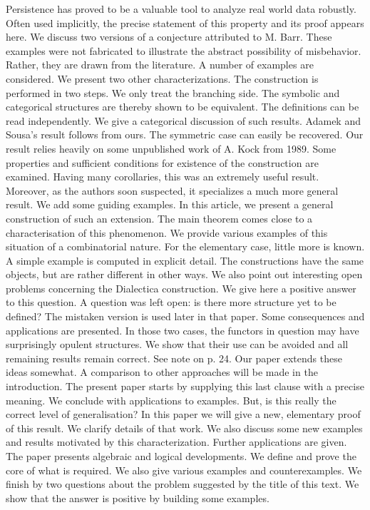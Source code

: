 Persistence has proved to be a valuable tool to analyze real world data robustly.
Often used implicitly, the precise statement of this property and its proof appears here.
We discuss two versions of a conjecture attributed to M. Barr.
These examples were not fabricated to illustrate the abstract possibility of misbehavior.
Rather, they are drawn from the literature.
A number of examples are considered.
We present two other characterizations.
The construction is performed in two steps.
We only treat the branching side.
The symbolic and categorical structures are thereby shown to be equivalent.
The definitions can be read independently.
We give a categorical discussion of such results.
Adamek and Sousa's result follows from ours.
The symmetric case can easily be recovered.
Our result relies heavily on some unpublished work of A. Kock from 1989.
Some properties and sufficient conditions for existence of the construction are examined.
Having many corollaries, this was an extremely useful result.
Moreover, as the authors soon suspected, it specializes a much more general result.
We add some guiding examples.
In this article, we present a general construction of such an extension.
The main theorem comes close to a characterisation of this phenomenon.
We provide various examples of this situation of a combinatorial nature.
For the elementary case, little more is known.
A simple example is computed in explicit detail.
The constructions have the same objects, but are rather different in other ways.
We also point out interesting open problems concerning the Dialectica construction.
We give here a positive answer to this question.
A question was left open: is there more structure yet to be defined?
The mistaken version is used later in that paper.
Some consequences and applications are presented.
In those two cases, the functors in question may have surprisingly opulent structures. 	 		
We show that their use can be avoided and all remaining results remain correct.
See note on p. 24.
Our paper extends these ideas somewhat.
A comparison to other approaches will be made in the introduction.
The present paper starts by supplying this last clause with a precise meaning.
We conclude with applications to examples.
But, is this really the correct level of generalisation?
In this paper we will give a new, elementary proof of this result.
We clarify details of that work.
We also discuss some new examples and results motivated by this characterization.
Further applications are given.
The paper presents algebraic and logical developments. 							
We define and prove the core of what is required.
We also give various examples and counterexamples.
We finish by two questions about the problem suggested by the title of this text. 				
We show that the answer is positive by building some examples.			

